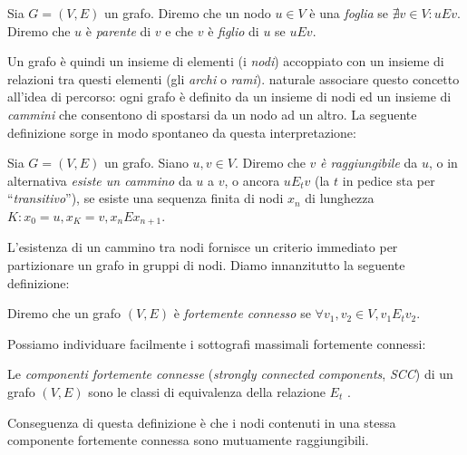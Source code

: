 \begin{definition}
    Sia $G = (V,E)$ un grafo. Diremo che un nodo $u \in V$ è una \emph{foglia} se $\nexists v \in V : u E v$. Diremo che $u$ è \emph{parente} di $v$ e che $v$ è \emph{figlio} di $u$ se $uEv$.
\end{definition}
Un grafo è quindi un insieme di elementi (i \emph{nodi}) accoppiato con un insieme di relazioni tra questi elementi (gli \emph{archi} o \emph{rami}). \accente naturale associare questo concetto all'idea di percorso: ogni grafo è definito da un insieme di nodi ed un insieme di \emph{cammini} che consentono di spostarsi da un nodo ad un altro. La seguente definizione sorge in modo spontaneo da questa interpretazione:
\begin{definition}
    Sia $G = (V, E)$ un grafo. Siano $u,v \in V$. Diremo che $v$ \emph{è raggiungibile} da $u$, o in alternativa \emph{esiste un cammino} da $u$ a $v$, o ancora $u E_t v$ (la $t$ in pedice sta per ``\emph{transitivo}''), se esiste una sequenza finita di nodi $x_n$ di lunghezza $K : x_0 = u, x_K = v, x_n E x_{n+1}$.
\end{definition}
L'esistenza di un cammino tra nodi fornisce un criterio immediato per partizionare un grafo in gruppi di nodi. Diamo innanzitutto la seguente definizione:
\begin{definition}
    Diremo che un grafo $(V,E)$ è \emph{fortemente connesso} se $\forall v_1, v_2 \in V, v_1 E_t v_2$.
\end{definition}
Possiamo individuare facilmente i sottografi massimali fortemente connessi:
\begin{definition}
    Le \emph{componenti fortemente connesse} (\emph{strongly connected components}, \emph{SCC}) di un grafo $(V,E)$ sono le classi di equivalenza della relazione $E_t$ \cite[Appendice B]{clrs}.
\end{definition}
Conseguenza di questa definizione è che i nodi contenuti in una stessa componente fortemente connessa sono mutuamente raggiungibili.
